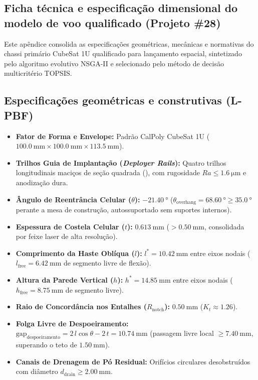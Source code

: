 \begin{apendicesenv}

\chapter{Ficha técnica e especificação dimensional do modelo de voo qualificado (Projeto \#28)}
\label{apendice:ficha-tecnica}

Este apêndice consolida as especificações geométricas, mecânicas e normativas do chassi primário CubeSat 1U qualificado para lançamento espacial, sintetizado pelo algoritmo evolutivo NSGA-II e selecionado pelo método de decisão multicritério TOPSIS.

\section*{Especificações geométricas e construtivas (L-PBF)}
\begin{itemize}
  \item \textbf{Fator de Forma e Envelope:} Padrão CalPoly CubeSat 1U ($\SI{100.0}{\milli\metre} \times \SI{100.0}{\milli\metre} \times \SI{113.5}{\milli\metre}$).
  \item \textbf{Trilhos Guia de Implantação (\textit{Deployer Rails}):} Quatro trilhos longitudinais maciços de seção quadrada (\rail{}), com rugosidade $Ra \le \SI{1.6}{\micro\metre}$ e anodização dura.
  \item \textbf{Ângulo de Reentrância Celular ($\theta$):} $\SI{-21.40}{\degree}$ ($\theta_{\text{overhang}} = \SI{68.60}{\degree} \ge \SI{35.0}{\degree}$ perante a mesa de construção, autossuportado sem suportes internos).
  \item \textbf{Espessura de Costela Celular ($t$):} $\SI{0.613}{\milli\metre}$ ($> \SI{0.50}{\milli\metre}$, consolidada por feixe laser de alta resolução).
  \item \textbf{Comprimento da Haste Oblíqua ($l$):} $l^* = \SI{10.42}{\milli\metre}$ entre eixos nodais ($l_{\text{free}} = \SI{6.42}{\milli\metre}$ de segmento livre de flexão).
  \item \textbf{Altura da Parede Vertical ($h$):} $h^* = \SI{14.85}{\milli\metre}$ entre eixos nodais ($h_{\text{free}} = \SI{8.75}{\milli\metre}$ de segmento livre).
  \item \textbf{Raio de Concordância nos Entalhes ($R_{\text{notch}}$):} $\SI{0.50}{\milli\metre}$ ($K_t \approx \num{1.26}$).
  \item \textbf{Folga Livre de Despoeiramento:} $\text{gap}_{\text{despoeiramento}} = 2\,l\cos\theta - 2\,t = \SI{10.74}{\milli\metre}$ (passagem livre local $\ge \SI{7.40}{\milli\metre}$, superando o teto de $\SI{1.50}{\milli\metre}$).
  \item \textbf{Canais de Drenagem de Pó Residual:} Orifícios circulares desobstruídos com diâmetro $d_{\text{drain}} \ge \SI{2.00}{\milli\metre}$.
\end{itemize}


\end{apendicesenv}
